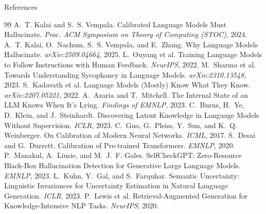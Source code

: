 \documentclass[aspectratio=169,11pt]{beamer}
\begin{document}
\begin{frame}[allowframebreaks]{References}
  \footnotesize
  \begin{thebibliography}{99}
     A.~T. Kalai and S.~S. Vempala. Calibrated Language Models Must Hallucinate. \emph{Proc. ACM Symposium on Theory of Computing (STOC)}, 2024.
     A.~T. Kalai, O.~Nachum, S.~S. Vempala, and E.~Zhang. Why Language Models Hallucinate. \emph{arXiv:2509.04664}, 2025.
     L.~Ouyang et al. Training Language Models to Follow Instructions with Human Feedback. \emph{NeurIPS}, 2022.
     M.~Sharma et al. Towards Understanding Sycophancy in Language Models. \emph{arXiv:2310.13548}, 2023.
     S.~Kadavath et al. Language Models (Mostly) Know What They Know. \emph{arXiv:2207.05221}, 2022.
     A.~Azaria and T.~Mitchell. The Internal State of an LLM Knows When It's Lying. \emph{Findings of EMNLP}, 2023.
     C.~Burns, H.~Ye, D.~Klein, and J.~Steinhardt. Discovering Latent Knowledge in Language Models Without Supervision. \emph{ICLR}, 2023.
     C.~Guo, G.~Pleiss, Y.~Sun, and K.~Q. Weinberger. On Calibration of Modern Neural Networks. \emph{ICML}, 2017.
     S.~Desai and G.~Durrett. Calibration of Pre-trained Transformers. \emph{EMNLP}, 2020.
     P.~Manakul, A.~Liusie, and M.~J.~F. Gales. SelfCheckGPT: Zero-Resource Black-Box Hallucination Detection for Generative Large Language Models. \emph{EMNLP}, 2023.
     L.~Kuhn, Y.~Gal, and S.~Farquhar. Semantic Uncertainty: Linguistic Invariances for Uncertainty Estimation in Natural Language Generation. \emph{ICLR}, 2023.
     P.~Lewis et al. Retrieval-Augmented Generation for Knowledge-Intensive NLP Tasks. \emph{NeurIPS}, 2020.
  \end{thebibliography}
\end{frame}
\end{document}
